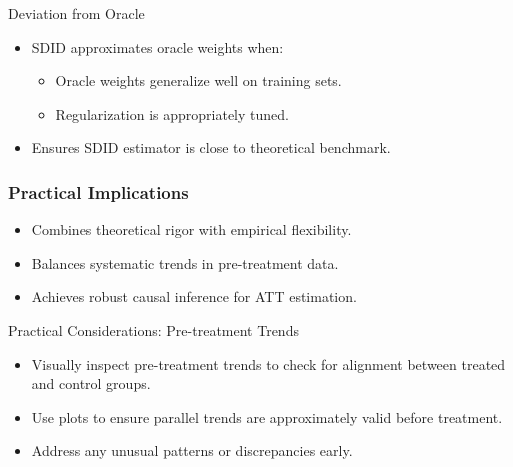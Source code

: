 \documentclass{beamer}
\begin{document}
\begin{frame}{Deviation from Oracle}
\begin{itemize}
\item SDID approximates oracle weights when:
    \begin{itemize}
    \item Oracle weights generalize well on training sets.
    \item Regularization is appropriately tuned.
    \end{itemize}
\item Ensures SDID estimator is close to theoretical benchmark.
\end{itemize}
\end{frame}


\begin{frame}
\frametitle{Practical Implications}

\begin{itemize}
    \item Combines theoretical rigor with empirical flexibility.
    \item Balances systematic trends in pre-treatment data.
    \item Achieves robust causal inference for ATT estimation.
\end{itemize}

\end{frame}



\begin{frame}{Practical Considerations: Pre-treatment Trends}

\begin{itemize}
    \item Visually inspect pre-treatment trends to check for alignment between treated and control groups.
    \item Use plots to ensure parallel trends are approximately valid before treatment.
    \item Address any unusual patterns or discrepancies early.
\end{itemize}

\end{frame}
\end{document}
